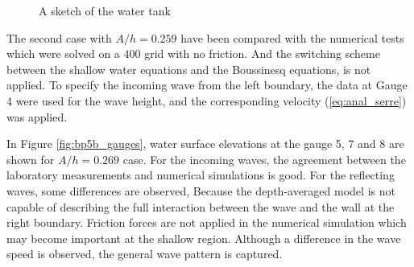 \documentclass[review]{elsarticle}
\begin{document}
\begin{figure}[!htb]
\centering
{}
  \caption{A sketch of the water tank}
  \label{fig:bp5_water_tank}
\end{figure}

The second case with $A/h=0.259$ have been 
compared with the numerical tests
which were solved on a $400$ grid with no friction.
And the switching scheme between the shallow water equations
and the Boussinesq equations, is not applied.
To specify the incoming wave from the left boundary, 
the data at Gauge 4 were used for the wave height,
and the corresponding velocity (\ref{eq:anal_serre})
was applied.

In Figure \ref{fig:bp5b_gauges}, water surface elevations
at the gauge 5, 7 and 8 are shown for $A/h=0.269$ case. 
For the incoming waves, the agreement 
between the laboratory measurements and numerical simulations is good. 
For the reflecting waves, some differences are observed,
Because the depth-averaged model is not capable 
of describing the full interaction between the wave and the wall
at the right boundary. 
Friction forces are not applied in the numerical simulation
which may become important at the shallow region. 
Although a difference in the wave speed is observed,
the general wave pattern is captured. 
\end{document}
